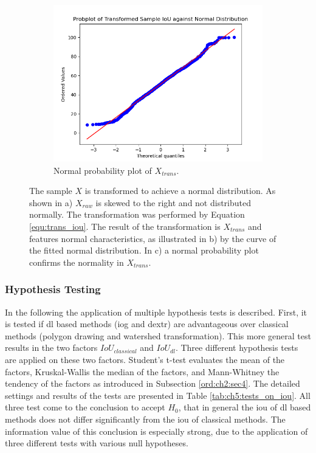 \begin{figure} [h]
	\begin{subfigure}[t]{0.3\textwidth}
		\centering
		\includegraphics[width=\textwidth]{figures/chap51_iou_probplot.png}
		\caption{
			Normal probability plot of $X_{trans}$.
		}\label{fig:ch5:sec1:probplot}
	\end{subfigure}
	\caption[IoU Sample Transformation]{		
		The sample $X$ is transformed to achieve a normal distribution.
		As shown in a) $X_{raw}$ is skewed to the right and not distributed normally.
		The transformation was performed by Equation \ref{equ:trans_iou}.
		The result of the transformation is $X_{trans}$ and features normal characteristics, as illustrated in b) by the curve of the fitted normal distribution.
		In c) a normal probability plot confirms the normality in $X_{trans}$.
	}\label{fig:ch5:sec1:data_transformation_iou}
\end{figure}


\subsubsection{Hypothesis Testing}

In the following the application of multiple hypothesis tests is described.
First, it is tested if \gls{dl} based methods (\gls{iog} and \gls{dextr}) are advantageous over classical methods (polygon drawing and watershed transformation).
This more general test results in the two factors $IoU_{classical}$ and $IoU_{dl}$.
Three different hypothesis tests are applied on these two factors.
Student's t-test evaluates the mean of the factors, Kruskal-Wallis the median of the factors, and Mann-Whitney the tendency of the factors as introduced in Subsection \ref{ord:ch2:sec4}.
The detailed settings and results of the tests are presented in Table \ref{tab:ch5:tests_on_iou}.
All three test come to the conclusion to accept $H_{0}$, that in general the \gls{iou} of \gls{dl} based methods does not differ significantly from the \gls{iou} of classical methods.
The information value of this conclusion is especially strong, due to the application of three different tests with various null hypotheses.


